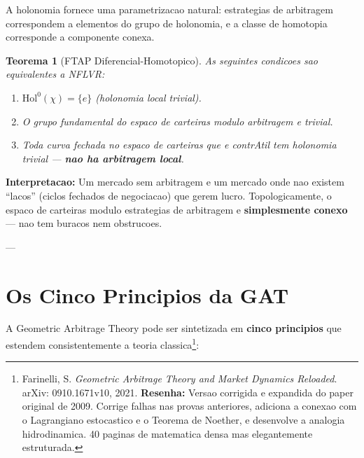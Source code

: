 \documentclass[12pt,a4paper]{article}
\newtheorem{teo}{Teorema}[section]
\theoremstyle{remark}
\begin{document}
A holonomia fornece uma parametrizacao natural: estrategias de arbitragem
correspondem a elementos do grupo de holonomia, e a classe de homotopia
corresponde a componente conexa.

\begin{teo}[FTAP Diferencial-Homotopico]
As seguintes condicoes sao equivalentes a NFLVR:
\begin{enumerate}[label=(\roman*),nosep]
  \item $\text{Hol}^0(\chi) = \{e\}$ (holonomia local trivial).
  \item O grupo fundamental do espaco de carteiras modulo arbitragem e trivial.
  \item Toda curva fechada no espaco de carteiras que e contrAtil tem holonomia
        trivial — \textbf{nao ha arbitragem local}.
\end{enumerate}
\end{teo}

\textbf{Interpretacao:} Um mercado sem arbitragem e um mercado onde nao existem
``lacos'' (ciclos fechados de negociacao) que gerem lucro. Topologicamente, o
espaco de carteiras modulo estrategias de arbitragem e \textbf{simplesmente
conexo} — nao tem buracos nem obstrucoes.

---

\section{Os Cinco Principios da GAT}

A Geometric Arbitrage Theory pode ser sintetizada em \textbf{cinco principios}
que estendem consistentemente a teoria classica\footnote{Farinelli, S.
\textit{Geometric Arbitrage Theory and Market Dynamics Reloaded}. arXiv:
0910.1671v10, 2021. \textbf{Resenha:} Versao corrigida e expandida do paper
original de 2009. Corrige falhas nas provas anteriores, adiciona a conexao com
o Lagrangiano estocastico e o Teorema de Noether, e desenvolve a analogia
hidrodinamica. 40 paginas de matematica densa mas elegantemente estruturada.}:
\end{document}
